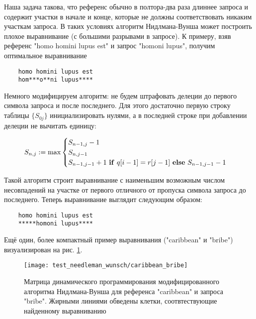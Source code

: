 \documentclass{main.tex}[subfiles]
\begin{document}
Наша задача такова, что референс обычно в полтора-два раза длиннее запроса и содержит участки в начале и конце, которые не должны соответствовать никаким участкам запроса.
В таких условиях алгоритм Нидлмана-Вунша может построить плохое выравнивание (с большими разрывами в запросе).
К примеру, взяв референс "homo homini lupus est"\hspace{0pt} и запрос "homoni lupus", получим оптимальное выравнивание

\begin{verbatim}
    homo homini lupus est
    hom***o**ni lupus****
\end{verbatim}

Немного модифицируем алгоритм: не будем штрафовать делеции до первого символа запроса и после последнего.
Для этого достаточно первую строку таблицы $ \{ S_{0j} \} $ инициализировать нулями, а в последней строке при добавлении делеции не вычитать единицу:

\[ S_{n,j} := \max \begin{cases}
    S_{n-1,j} - 1 \\
    S_{n,j-1} \\
    S_{n-1,j-1} + 1 \text{ \textbf{if} } q[i-1] = r[j-1] \text{ \textbf{else} } S_{n-1,j-1} - 1
\end{cases} \]

Такой алгоритм строит выравнивание с наименьшим возможным числом несовпадений на участке от первого отличного от пропуска символа запроса до последнего. %
Теперь выравнивание выглядит следующим образом:

\begin{verbatim}
    homo homini lupus est
    *****homoni lupus****
\end{verbatim}

Ещё один, более компактный пример выравнивания ("caribbean"\hspace{0pt} и "bribe") визуализирован на рис. \ref{fig:caribbean_bribe}.

\begin{figure}[H]
    \centering
    \texttt{[image: test\_needleman\_wunsch/caribbean\_bribe]}
    \caption{Матрица динамического программирования модифицированного алгоритма Нидлмана-Вунша для референса "caribbean"\hspace{0pt} и запроса "bribe". Жирными линиями обведены клетки, соотвтествующие найденному выравниванию }
    \label{fig:caribbean_bribe}
\end{figure}
\end{document}
